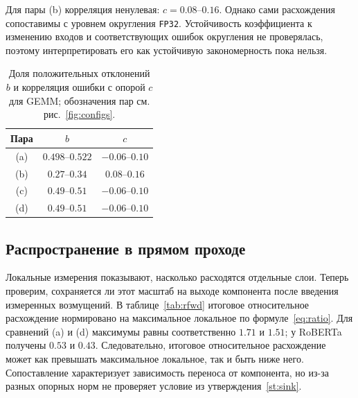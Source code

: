 Для пары (b) корреляция ненулевая: $c=0.08$--$0.16$.
Однако сами расхождения сопоставимы с уровнем округления
\texttt{FP32}. Устойчивость коэффициента к изменению входов
и соответствующих ошибок округления не проверялась, поэтому
интерпретировать его как устойчивую закономерность пока нельзя.

\begin{table}[!htbp]
    \centering
    \caption{Доля положительных отклонений $b$ и корреляция ошибки
        с опорой $c$ для GEMM; обозначения пар см. рис.~\ref{fig:configs}.}
    \label{tab:diag}
    \begin{tabular}{c c c}
        \hline
        \textbf{Пара} & \textbf{$b$} & \textbf{$c$} \\
        \hline
        (a) & $0.498$--$0.522$ & $-0.06$--$0.10$ \\
        (b) & $0.27$--$0.34$   & $0.08$--$0.16$ \\
        (c) & $0.49$--$0.51$   & $-0.06$--$0.10$ \\
        (d) & $0.49$--$0.51$   & $-0.06$--$0.10$ \\
        \hline
    \end{tabular}
\end{table}

\subsection{Распространение в прямом проходе}

Локальные измерения показывают, насколько расходятся отдельные слои.
Теперь проверим, сохраняется ли этот масштаб на выходе компонента
после введения измеренных возмущений. В таблице~\ref{tab:rfwd}
итоговое относительное расхождение нормировано на максимальное
локальное по формуле~\eqref{eq:ratio}.
Для сравнений (a) и (d) максимумы равны соответственно $1.71$ и $1.51$;
у RoBERTa получены $0.53$ и $0.43$.
Следовательно, итоговое относительное расхождение может как превышать
максимальное локальное, так и быть ниже него. Сопоставление характеризует
зависимость переноса от компонента, но из-за разных опорных норм
не проверяет условие из утверждения~\ref{st:sink}.

